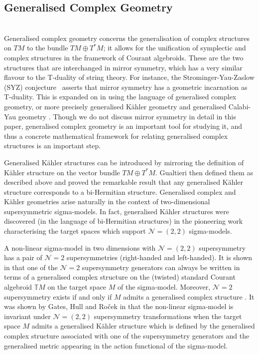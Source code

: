 \documentclass[a4paper, reqno, 11pt]{amsart}
\numberwithin{equation}{section}
\theoremstyle{definition}
\newcommand{\IT}{\mathbb{T}}
\newcommand{\cN}{{\mathcal N}}
\theoremstyle{remark}
\begin{document}
\medskip

\subsection{Generalised Complex Geometry}~\\[5pt]
Generalised complex geometry concerns the generalisation of complex structures on $TM$ to the bundle $T M \oplus T^*M$; it allows for the unification of symplectic and complex structures in the framework of Courant algebroids. These are the two structures that are interchanged in mirror symmetry, which has a very similar flavour to the T-duality of string theory. For instance, the Strominger-Yau-Zaslow (SYZ) conjecture~\cite{strominger1996mirror} asserts that mirror symmetry has a geometric incarnation as T-duality. This is expanded on in \cite{ben2004mirror} using the language of generalised complex geometry, or more precisely generalised K\"ahler geometry \cite{gualtieri2014generalized} and generalised Calabi-Yau geometry \cite{Hitchin:2003cxu}. 
Though we do not discuss mirror symmetry in detail in this paper, generalised complex geometry is an important tool for studying it, and thus a concrete mathematical framework for relating generalised complex structures is an important step. 

Generalised K{\"a}hler structures can be introduced by mirroring the definition of K{\"a}hler structure on the vector bundle $TM \oplus T^*M$.  
Gualtieri \cite{gualtieri:tesi} then defined them as described above and proved the remarkable result that any generalised K{\"a}hler structure corresponds to a bi-Hermitian structure.   
Generalised complex and K{\"a}hler geometries arise naturally in the context of two-dimensional supersymmetric sigma-models. In fact, generalised K{\"a}hler structures were discovered (in the language of bi-Hermitian structures) in the pioneering work \cite{Gates:1984nk} characterising the target spaces which support $\cN=(2,2)$  sigma-models.

A non-linear sigma-model in two dimensions with $\cN=(2,2)$ supersymmetry has a pair of $\cN=2$ supersymmetries (right-handed and left-handed). It is shown in \cite{Zabzine:2005qf} that one of the $\cN=2$ supersymmetry generators can always be written in terms of a generalised complex structure on the (twisted) standard Courant algebroid $\IT M$ on the target space $M$ of the sigma-model. Moreover, $\cN=2$ supersymmetry exists if and only if $M$ admits a generalised complex structure \cite{Zabzine:2005qf}.
It was shown by Gates, Hull and Ro{\v c}ek in \cite{Gates:1984nk} that the non-linear sigma-model is invariant under $\cN=(2,2)$ supersymmetry transformations when the target space $M$ admits a generalised K{\"a}hler structure which is defined by the generalised complex structure associated with one of the supersymmetry generators and the generalised metric appearing in the action functional of the sigma-model.
\end{document}

